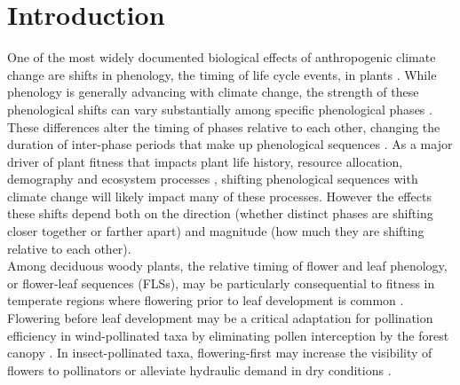 \documentclass[11pt]{article}
\begin{document}
\section*{Introduction}
\noindent One of the most widely documented biological effects of anthropogenic climate change are shifts in phenology, the timing of life cycle events, in plants \citep{Parmesan2003,Menzel2006,Cleland2007}. While phenology is generally advancing with climate change, the strength of these phenological shifts can vary substantially among specific phenological phases \citep{Augspurger:2020aa}. These differences alter the timing of phases relative to each other, changing the duration of inter-phase periods that make up phenological sequences \citep{Ettinger2018}. As a major driver of plant fitness that impacts plant life history, resource allocation, demography and ecosystem processes \citep{Post:2008aa}, shifting phenological sequences with climate change will likely impact many of these processes. However the effects these shifts depend both on the direction (whether distinct phases are shifting closer together or farther apart) and magnitude (how much they are shifting relative to each other).\\  %

\noindent Among deciduous woody plants, the relative timing of flower and leaf phenology, or flower-leaf sequences (FLSs), may be particularly consequential to fitness in temperate regions where flowering prior to leaf development is common \citep{Rathcke_1985,Gougherty2018}. Flowering before leaf development may be a critical adaptation for pollination efficiency in wind-pollinated taxa by eliminating pollen interception by the forest canopy \citep{Whitehead1969}. In insect-pollinated taxa, flowering-first may increase the visibility of flowers to pollinators \citep{Janzen1967,Savage2019} or alleviate hydraulic demand in dry conditions \citep{Gougherty2018, Franklin2016}.\\ %
\end{document}
